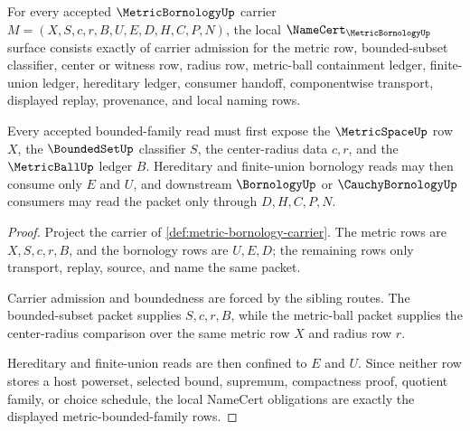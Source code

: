 \begin{theorem}
\label{thm:metric-bornology-namecert-obligations}
For every accepted $\MetricBornologyUp$ carrier $M=(X,S,c,r,B,U,E,D,H,C,P,N)$, the local $\NameCert_{\MetricBornologyUp}$ surface consists exactly of carrier admission for the metric row, bounded-subset classifier, center or witness row, radius row, metric-ball containment ledger, finite-union ledger, hereditary ledger, consumer handoff, componentwise transport, displayed replay, provenance, and local naming rows.

Every accepted bounded-family read must first expose the $\MetricSpaceUp$ row $X$, the $\BoundedSetUp$ classifier $S$, the center-radius data $c,r$, and the $\MetricBallUp$ ledger $B$. Hereditary and finite-union bornology reads may then consume only $E$ and $U$, and downstream $\BornologyUp$ or $\CauchyBornologyUp$ consumers may read the packet only through $D,H,C,P,N$.
\end{theorem}
\begin{proof}
Project the carrier of \autoref{def:metric-bornology-carrier}. The metric rows are $X,S,c,r,B$, and the bornology rows are $U,E,D$; the remaining rows only transport, replay, source, and name the same packet.

Carrier admission and boundedness are forced by the sibling routes. The bounded-subset packet supplies $S,c,r,B$, while the metric-ball packet supplies the center-radius comparison over the same metric row $X$ and radius row $r$.

Hereditary and finite-union reads are then confined to $E$ and $U$. Since neither row stores a host powerset, selected bound, supremum, compactness proof, quotient family, or choice schedule, the local NameCert obligations are exactly the displayed metric-bounded-family rows.
\end{proof}

